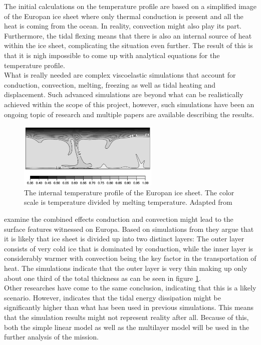 The initial calculations on the temperature profile are based on a simplified image of the Europan ice sheet where only thermal conduction is present and all the heat is coming from the ocean. In reality, convection might also play its part. Furthermore, the tidal flexing means that there is also an internal source of heat within the ice sheet, complicating the situation even further. The result of this is that it is nigh impossible to come up with analytical equations for the temperature profile.\\

\noindent
What is really needed are complex viscoelastic simulations that account for conduction, convection, melting, freezing as well as tidal heating and displacement. Such advanced simulations are beyond what can be realistically achieved within the scope of this project, however, such simulations have been an ongoing topic of research and multiple papers are available describing the results.\\

\begin{figure}[ht]
	\centering
	\includegraphics[width = 0.6\textwidth]{figures/LAMC/2layer}
	\caption{The internal temperature profile of the Europan ice sheet. The color scale is temperature divided by melting temperature. Adapted from \cite{article:barr2014a}}
	\label{fig:2layer}
\end{figure}

\noindent 
\citet{article:barr2014a} examine the combined effects conduction and convection might lead to the surface features witnessed on Europa. Based on simulations from \citet{article:showman2005a} they argue that it is likely that ice sheet is divided up into two distinct layers: The outer layer consists of very cold ice that is dominated by conduction, while the inner layer is considerably warmer with convection being the key factor in the transportation of heat. The simulations indicate that the outer layer is very thin making up only about one third of the total thickness as can be seen in figure \ref{fig:2layer}. \\

\noindent
Other researches have come to the same conclusion, indicating that this is a likely scenario\cite{article:mckinnon1999a}\cite{article:tobie2003a}. However, \citet{article:mccarthy2016a} indicates that the tidal energy dissipation might be significantly higher than what has been used in previous simulations. This means that the simulation results might not represent reality after all. Because of this, both the simple linear model as well as the multilayer model will be used in the further analysis of the mission.
